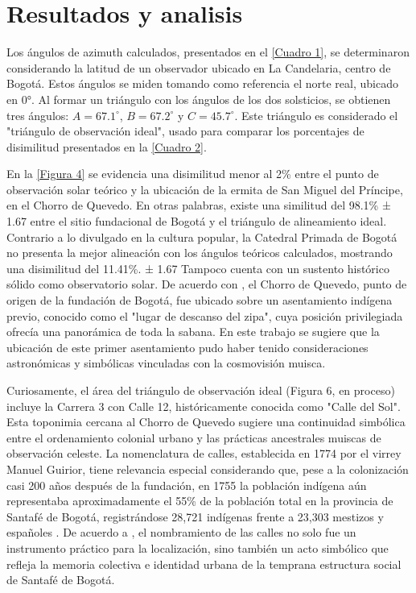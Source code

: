 \documentclass[a4paper,alpha-refs]{eSpectra}
\begin{document}
\section{Resultados y analisis}
Los ángulos de azimuth calculados, presentados en el \autoref{Cuadro 1}, se determinaron considerando la latitud de un observador ubicado en La Candelaria, centro de Bogotá. Estos ángulos se miden tomando como referencia el norte real, ubicado en 0°. Al formar un triángulo con los ángulos de los dos solsticios, se obtienen tres ángulos: \(A=67.1^{\circ}\), \(B=67.2^{\circ}\) y \(C=45.7^{\circ}\). Este triángulo es considerado el "triángulo de observación ideal", usado para comparar los porcentajes de disimilitud presentados en la \autoref{Cuadro 2}.

\smallskip

En la \autoref{Figura 4} se evidencia una disimilitud menor al 2\% entre el punto de observación solar teórico y la ubicación de la ermita de San Miguel del Príncipe, en el Chorro de Quevedo. En otras palabras, existe una similitud del 98.1\% ± 1.67 entre el sitio fundacional de Bogotá y el triángulo de alineamiento ideal. Contrario a lo divulgado en la cultura popular, la Catedral Primada de Bogotá no presenta la mejor alineación con los ángulos teóricos calculados, mostrando una disimilitud del 11.41\%. ± 1.67  Tampoco cuenta con un sustento histórico sólido como observatorio solar. De acuerdo con \cite{martínez1987santafé}, el Chorro de Quevedo, punto de origen de la fundación de Bogotá, fue ubicado sobre un asentamiento indígena previo, conocido como el "lugar de descanso del zipa", cuya posición privilegiada ofrecía una panorámica de toda la sabana. En este trabajo se sugiere que la ubicación de este primer asentamiento pudo haber tenido consideraciones astronómicas y simbólicas vinculadas con la cosmovisión muisca.

\smallskip

Curiosamente, el área del triángulo de observación ideal (Figura 6, en proceso) incluye la Carrera 3 con Calle 12, históricamente conocida como "Calle del Sol". Esta toponimia cercana al Chorro de Quevedo sugiere una continuidad simbólica entre el ordenamiento colonial urbano y las prácticas ancestrales muiscas de observación celeste. La nomenclatura de calles, establecida en 1774 por el virrey Manuel Guirior, tiene relevancia especial considerando que, pese a la colonización casi 200 años después de la fundación, en 1755 la población indígena aún representaba aproximadamente el 55\% de la población total en la provincia de Santafé de Bogotá, registrándose 28,721 indígenas frente a 23,303 mestizos y españoles \cite{rappaport2014disappearing}. De acuerdo a \cite{mejia1999anos}, el nombramiento de las calles no solo fue un instrumento práctico para la localización, sino también un acto simbólico que refleja la memoria colectiva e identidad urbana de la temprana estructura social de Santafé de Bogotá.
\end{document}
